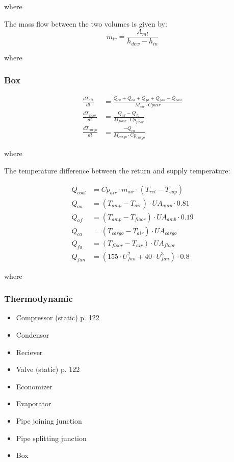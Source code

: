 where

The mass flow between the two volumes is given by:
\begin{equation}
	\dot{m_{lv}} = \frac{A_{ml}}{h_{dew} - h_{in}}
\end{equation}

where

\subsubsection{Box}

\begin{align}
	\frac{dT_{air}}{dt} & = \frac{Q_{ca} + Q_{aa} + Q_{fa} + Q_{fan} -Q_{cool}}{M_{air} \cdot Cp{air}} \\
	\frac{dT_{floor}}{dt} & = \frac{Q_{af} - Q_{fa}}{M_{floor} \cdot Cp_{floor}} \\
	\frac{dT_{cargo}}{dt} & = \frac{-Q_{ca}}{M_{cargo} \cdot Cp_{cargo}}
\end{align}

where

The temperature difference between the return and supply temperature:

\begin{align}
	Q_{cool} & = Cp_{air} \cdot \dot{m_{air}} \cdot (T_{ret} - T_{sup})\\
	Q_{aa} & = (T_{amp} - T_{air}) \cdot U A_{amp} \cdot 0.81\\
	Q_{af} & = (T_{amp} - T_{floor}) \cdot U A_{amb} \cdot 0.19\\
	Q_{ca} & = (T_{cargo} - T_{air}) \cdot U A_{cargo}\\
	Q_{fa} & = (T_{floor} - T_{air}) \cdot U A_{floor}\\
	Q_{fan} & = (155 \cdot U_{fan}^2 + 40 \cdot U_{fan}^3) \cdot 0.8
\end{align}

where


\subsubsection{Thermodynamic}

\begin{itemize}
	\item Compressor (static) \cite{Sorensen2013} p. 122
	\item Condensor
	\item Reciever
	\item Valve (static) \cite{Sorensen2013} p. 122
	\item Economizer
	\item Evaporator
	\item Pipe joining junction
	\item Pipe splitting junction
	\item Box
\end{itemize}


